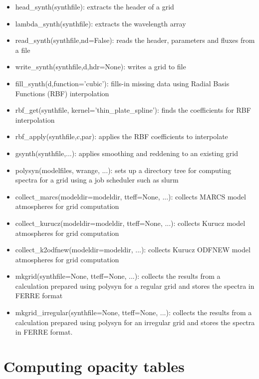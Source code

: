 \documentclass[]{article}
\begin{document}
\begin{itemize}
\item head\_synth(synthfile): extracts the header of a grid
\item lambda\_synth(synthfile): extracts the wavelength array
\item read\_synth(synthfile,nd=False): reads the header, parameters and fluxes from a file
\item write\_synth(synthfile,d,hdr=None): writes a grid to file
\item fill\_synth(d,function='cubic'): fills-in missing data using Radial Basis Functions (RBF) interpolation
\item rbf\_get(synthfile, kernel='thin\_plate\_spline'): finds the coefficients for RBF interpolation
\item rbf\_apply(synthfile,c,par): applies the RBF coefficients to interpolate
\item gsynth(synthfile,...): applies smoothing and reddening to an existing grid
\item polysyn(modelfiles, wrange, ...): sets up a directory tree for computing spectra for a grid using a job scheduler such as slurm
\item collect\_marcs(modeldir=modeldir, tteff=None, ...): collects MARCS model atmospheres for grid computation
\item collect\_kurucz(modeldir=modeldir, tteff=None, ...): collects Kurucz model atmospheres for grid computation
\item collect\_k2odfnew(modeldir=modeldir, ...): collects Kurucz ODFNEW model atmospheres for grid computation
\item mkgrid(synthfile=None, tteff=None, ...): collects the results from a calculation prepared using polysyn for a regular grid and stores the spectra in FERRE format
\item mkgrid\_irregular(synthfile=None, tteff=None, ...): collects the results from a calculation prepared using polysyn for an irregular grid and stores the spectra in FERRE format.
\end{itemize}

\section{Computing opacity tables}
\end{document}
